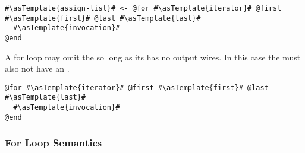 \begin{lstlisting}
#\asTemplate{assign-list}# <- @for #\asTemplate{iterator}# @first #\asTemplate{first}# @last #\asTemplate{last}#
  #\asTemplate{invocation}#
@end
\end{lstlisting}

A for loop may omit the  so long as its  has no output wires. In this case the  must also not have an .\\

\begin{lstlisting}
@for #\asTemplate{iterator}# @first #\asTemplate{first}# @last #\asTemplate{last}#
  #\asTemplate{invocation}#
@end
\end{lstlisting}

\subsubsection*{For Loop Semantics}

